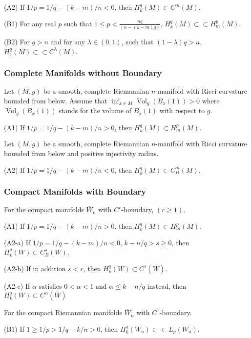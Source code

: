 \documentclass[12pt,hyperref,a4paper,UTF8]{ctexart}
\begin{document}
\vskip 2pt
(A2) If ${1/p=1 / q-(k-m) / n < 0}$, then ${H_k^q(M) \subset C^m(M)}$.
    
\vskip 2pt
(B1)  For any real ${p}$ such that ${1 \leq p<\frac{n q}{(n-(k-m) q)}}$, ${H_{k}^q(M)\subset \subset H_m^p(M)}$.
    
\vskip 2pt
(B2) For ${q>n}$ and for any ${\lambda \in (0,1)}$, such that ${(1-\lambda) q>n}$, ${H_1^q(M)\subset \subset C^\lambda(M)}$. 


\subsubsection{Complete Manifolds without Boundary}
\vskip -3pt
Let $(M, g)$ be a smooth, complete Riemannian $n$-manifold with Ricci curvature bounded from below. Assume that
$\inf _{x \in M} \operatorname{Vol}_g\left(B_x(1)\right)>0$
where $\operatorname{Vol}_g\left(B_x(1)\right)$ stands for the volume of $B_x(1)$ with respect to $g$.

\vskip 2pt
(A1) If ${1/p=1 / q-(k-m) / n > 0}$, then ${H_k^q(M) \subset H_m^p(M)}$.

\vskip 7pt
Let $(M, g)$ be a smooth, complete Riemannian $n$-manifold with Ricci curvature bounded from below and positive injectivity radius. 

\vskip 2pt
(A2) If ${1/p=1 / q-(k-m) / n < 0}$, then ${H_k^q(M) \subset C_B^m(M)}$.
  

\subsubsection{Compact Manifolds with Boundary}
\vskip -3pt
For the compact manifolds ${\bar{W}_n}$ with ${C^r}$-boundary, ${(r \geq 1)}$.

\vskip 2pt
(A1) If ${1/p=1 / q-(k-m) / n > 0}$, then ${H_k^q(M) \subset H_m^p(M)}$.
   
\vskip 2pt
(A2-a) If ${1/p=1 / q-(k-m) / n < 0}$, ${k-n / q>s \geq 0}$, then ${H_k^q(W) \subset C_B^s(W)}$.
    
\vskip 2pt
(A2-b) If in addition ${s<r}$, then ${H_k^q(W) \subset C^s(\bar{W})}$.

\vskip 2pt
(A2-c) If ${\alpha}$ satisfies ${0<\alpha<1}$ and ${\alpha \leq k-n / q}$ instead, then ${H_k^q(W) \subset C^\alpha(\bar{W})}$

\vskip 7pt
For the compact Riemannian manifolds ${\bar{W}_n}$ with ${C^1}$-boundary. 

\vskip 2pt
(B1) If ${1 \geq 1 / p>1 / q- k / n>0}$, then ${H_k^q\left(W_n\right) \subset\subset L_p\left(W_n\right)}$.
\end{document}
